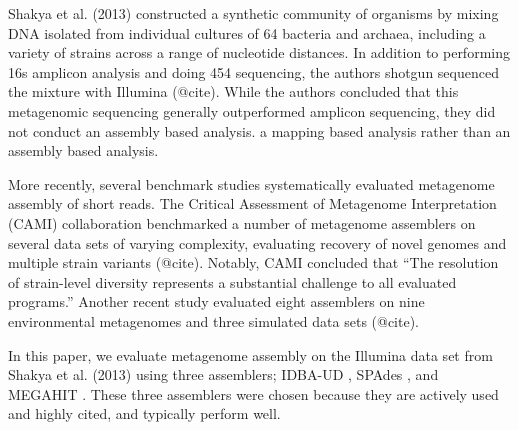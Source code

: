 \documentclass[11pt]{article}
\begin{document}
Shakya et al. (2013) constructed a synthetic community of organisms by
mixing DNA isolated from individual cultures of 64 bacteria and
archaea, including a variety of strains across a range of nucleotide
distances.  In addition to performing 16s amplicon analysis and doing
454 sequencing, the authors shotgun sequenced the mixture with
Illumina (@cite).  While the authors concluded that this metagenomic
sequencing generally outperformed amplicon sequencing, they did not
conduct an assembly based analysis.
a mapping based analysis rather than an assembly based analysis.


More recently, several benchmark studies systematically evaluated
metagenome assembly of short reads.  The Critical Assessment of
Metagenome Interpretation (CAMI) collaboration benchmarked a number of
metagenome assemblers on several data sets of varying complexity,
evaluating recovery of novel genomes and multiple strain variants
(@cite).  Notably, CAMI concluded that ``The resolution of
strain-level diversity represents a substantial challenge to all
evaluated programs.''  Another recent study evaluated eight assemblers
on nine environmental metagenomes and three simulated data sets (@cite).

In this paper, we evaluate metagenome assembly on the Illumina data set from
Shakya et al. (2013) using three assemblers; IDBA-UD \cite{idba},
SPAdes \cite {spades}, and MEGAHIT \cite{megahit}.  These three assemblers
were chosen because they are actively used and highly cited, and typically
perform well.



\end{document}

